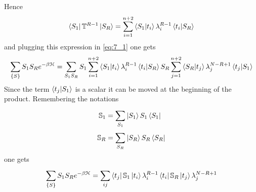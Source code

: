 \documentclass[../main/main.tex]{subfiles}
\begin{document}
Hence
\begin{equation}
  \bra{S_1} \mathbb{T}^{R-1} \ket{S_R} = \sum_{i=1}^{n+2} \braket{S_1}{t_i} \lambda_i ^{R-1} \braket{t_i}{S_R}
\end{equation}
and plugging this expression in  \eqref{eq:7_1} one gets
\begin{equation}
  \sum_{\{ S \}  }^{}  S_1 S_R e^{-\beta \mathcal{H}} = \sum_{S_1 S_R}^{} S_1 \sum_{i=1}^{n+2} \braket{S_1}{t_i} \lambda _i^{R-1} \braket{t_i}{S_R} S_R \sum_{j=1}^{n+2} \braket{S_R}{t_j} \lambda_j ^{N-R+1} \braket{t_j}{S_1}
\end{equation}
Since the term \( \braket{t_j}{S_1}  \) is a scalar it can be moved at the beginning of the product. Remembering the notations
\begin{subequations}
\begin{align}
  \mathbb{S}_1 &= \sum_{S_1}^{} \ket{S_1} S_1 \bra{S_1} \\
  \mathbb{S}_R &= \sum_{S_R}^{} \ket{S_R} S_R \bra{S_R}
\end{align}
\end{subequations}
one gets
\begin{equation}
  \sum_{\{ S \}  }^{}  S_1 S_R e^{-\beta \mathcal{H}}= \sum_{ij}^{} \bra{t_j } \mathbb{S}_1 \ket{t_i} \lambda _i^{R-1} \bra{t_i} \mathbb{S}_R \ket{t_j} \lambda _j ^{N-R+1}
\end{equation}
\end{document}

